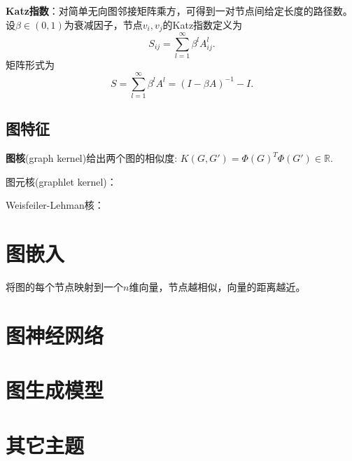 \par \textbf{Katz指数}：对简单无向图邻接矩阵乘方，可得到一对节点间给定长度的路径数。设$\beta \in (0,1)$为衰减因子，节点$v_i,v_j$的Katz指数定义为
\begin{equation}
    S_{ij}=\sum_{l=1}^\infty \beta^l A^l_{ij}.
\end{equation}
矩阵形式为
\begin{equation}
    S=\sum_{l=1}^\infty \beta^l A^l=(I-\beta A)^{-1}-I.
\end{equation}

\subsection{图特征}
\par \textbf{图核}(graph kernel)给出两个图的相似度: $K(G,G')=\Phi(G)^T \Phi(G')\in \mathbb{R}$.
\par 图元核(graphlet kernel)：

\par Weisfeiler-Lehman核：

\section{图嵌入}

\par 将图的每个节点映射到一个$n$维向量，节点越相似，向量的距离越近。

\section{图神经网络}

\section{图生成模型}

\section{其它主题}
